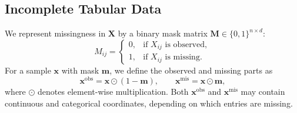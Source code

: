 \documentclass[times, review, 10pt]{elsarticle}
\begin{document}



\subsection{Incomplete Tabular Data}

We represent missingness in $\mathbf{X}$ by a binary mask matrix $\mathbf{M} \in \{0,1\}^{n \times d}$:
\[
M_{ij} =
\begin{cases}
0, & \text{if } X_{ij} \text{ is observed}, \\
1, & \text{if } X_{ij} \text{ is missing}.
\end{cases}
\]
For a sample $\mathbf{x}$ with mask $\mathbf{m}$, we define the observed and missing parts as
\[
\mathbf{x}^{\mathrm{obs}} = \mathbf{x} \odot (1 - \mathbf{m}),
\qquad
\mathbf{x}^{\mathrm{mis}} = \mathbf{x} \odot \mathbf{m},
\]
where $\odot$ denotes element-wise multiplication. Both $\mathbf{x}^{\mathrm{obs}}$ and $\mathbf{x}^{\mathrm{mis}}$ may contain continuous and categorical coordinates, depending on which entries are missing.
\end{document}
